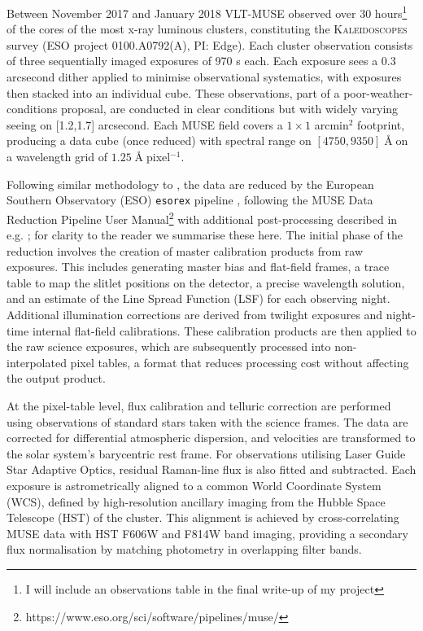 \documentclass[fleqn,usenatbib]{mnras}
\begin{document}
Between November 2017 and January 2018 VLT-MUSE \citep{bacon2010} observed over 30 hours\footnote{I will include an observations table in the final write-up of my project} of the cores of the most x-ray luminous clusters, constituting the \textsc{Kaleidoscopes} survey (ESO project 0100.A0792(A), PI: Edge). Each cluster observation consists of three sequentially imaged exposures of 970 s each. Each exposure sees a 0.3 arcsecond dither applied to minimise observational systematics, with exposures then stacked into an individual cube. These observations, part of a poor-weather-conditions proposal, are conducted in clear conditions but with widely varying seeing on [1.2,1.7] arcsecond. Each MUSE field covers a $1\times1$ arcmin$^2$ footprint, producing a data cube (once reduced) with spectral range on $[4750,9350]\;$\AA$\;$on a wavelength grid of $1.25 \;$\AA$\;$pixel$^{-1}$. 

Following similar methodology to \cite{fumigalli2017, jauzac, cerny2025}, the data are reduced by the European Southern Observatory (ESO) \texttt{esorex} pipeline \citep{weilbacher2020}, following the MUSE Data Reduction Pipeline User Manual\footnote{https://www.eso.org/sci/software/pipelines/muse/} with additional post-processing described in e.g. \cite{richard2021, lagatutta2022, cerny2025}; for clarity to the reader we summarise these here. The initial phase of the reduction involves the creation of master calibration products from raw exposures. This includes generating master bias and flat-field frames, a trace table to map the slitlet positions on the detector, a precise wavelength solution, and an estimate of the Line Spread Function (LSF) for each observing night. Additional illumination corrections are derived from twilight exposures and night-time internal flat-field calibrations. These calibration products are then applied to the raw science exposures, which are subsequently processed into non-interpolated pixel tables, a format that reduces processing cost without affecting the output product.


At the pixel-table level, flux calibration and telluric correction are performed using observations of standard stars taken with the science frames. The data are corrected for differential atmospheric dispersion, and velocities are transformed to the solar system’s barycentric rest frame. For observations utilising Laser Guide Star Adaptive Optics, residual Raman-line flux is also fitted and subtracted. Each exposure is astrometrically aligned to a common World Coordinate System (WCS), defined by high-resolution ancillary imaging from the Hubble Space Telescope (HST) of the cluster. This alignment is achieved by cross-correlating MUSE data with HST F606W and F814W band imaging, providing a secondary flux normalisation by matching photometry in overlapping filter bands.
\end{document}
